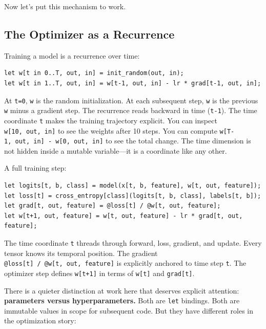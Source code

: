 \documentclass[11pt,titlepage]{article}
\begin{document}
Now let's put this mechanism to work.

\vspace{2em}

\hypertarget{the-optimizer-as-a-recurrence}{%
\subsection{The Optimizer as a
Recurrence}\label{the-optimizer-as-a-recurrence}}

Training a model is a recurrence over time:

\begin{verbatim}
let w[t in 0..T, out, in] = init_random(out, in);
let w[t in 1..T, out, in] = w[t-1, out, in] - lr * grad[t-1, out, in];
\end{verbatim}

At \texttt{t=0}, \texttt{w} is the random initialization. At each
subsequent step, \texttt{w} is the previous \texttt{w} minus a gradient
step. The recurrence reads backward in time (\texttt{t-1}). The time
coordinate \texttt{t} makes the training trajectory explicit. You can
inspect \texttt{w{[}10,\ out,\ in{]}} to see the weights after 10 steps.
You can compute \texttt{w{[}T-1,\ out,\ in{]}\ -\ w{[}0,\ out,\ in{]}}
to see the total change. The time dimension is not hidden inside a
mutable variable---it is a coordinate like any other.

A full training step:

\begin{verbatim}
let logits[t, b, class] = model(x[t, b, feature], w[t, out, feature]);
let loss[t] = cross_entropy[class](logits[t, b, class], labels[t, b]);
let grad[t, out, feature] = @loss[t] / @w[t, out, feature];
let w[t+1, out, feature] = w[t, out, feature] - lr * grad[t, out, feature];
\end{verbatim}

The time coordinate \texttt{t} threads through forward, loss, gradient,
and update. Every tensor knows its temporal position. The gradient
\texttt{@loss{[}t{]}\ /\ @w{[}t,\ out,\ feature{]}} is explicitly
anchored to time step \texttt{t}. The optimizer step defines
\texttt{w{[}t+1{]}} in terms of \texttt{w{[}t{]}} and
\texttt{grad{[}t{]}}.

There is a quieter distinction at work here that deserves explicit
attention: \textbf{parameters versus hyperparameters.} Both are
\texttt{let} bindings. Both are immutable values in scope for subsequent
code. But they have different roles in the optimization story:
\end{document}
